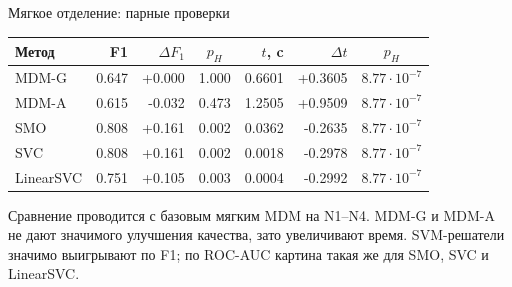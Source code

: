 \SPBGContentSlide
  {Мягкое отделение: парные проверки}
  {%
    \centering
    \TinyBody
    \renewcommand{\arraystretch}{1.12}
    \setlength{\tabcolsep}{2.8pt}
    \begin{tabular}{|l|r|r|c|r|r|c|}
      \hline
      \textbf{Метод} & \textbf{F1} & \textbf{$\Delta F_1$} & \textbf{$p_H$}
      & \textbf{$t$, c} & \textbf{$\Delta t$} & \textbf{$p_H$} \\
      \hline
      MDM-G & 0.647 & +0.000 & 1.000 & 0.6601 & +0.3605 & $8.77\cdot10^{-7}$ \\
      \hline
      MDM-A & 0.615 & -0.032 & 0.473 & 1.2505 & +0.9509 & $8.77\cdot10^{-7}$ \\
      \hline
      SMO & 0.808 & +0.161 & 0.002 & 0.0362 & -0.2635 & $8.77\cdot10^{-7}$ \\
      \hline
      SVC & 0.808 & +0.161 & 0.002 & 0.0018 & -0.2978 & $8.77\cdot10^{-7}$ \\
      \hline
      LinearSVC & 0.751 & +0.105 & 0.003 & 0.0004 & -0.2992 & $8.77\cdot10^{-7}$ \\
      \hline
    \end{tabular}

    \vspace{.18cm}
    \begin{minipage}{.90\linewidth}
      \SmallBody
      \raggedright
      Сравнение проводится с базовым мягким MDM на N1--N4. MDM-G и MDM-A не
      дают значимого улучшения качества, зато увеличивают время. SVM-решатели
      значимо выигрывают по F1; по ROC-AUC картина такая же для SMO, SVC и
      LinearSVC.
    \end{minipage}
  }
